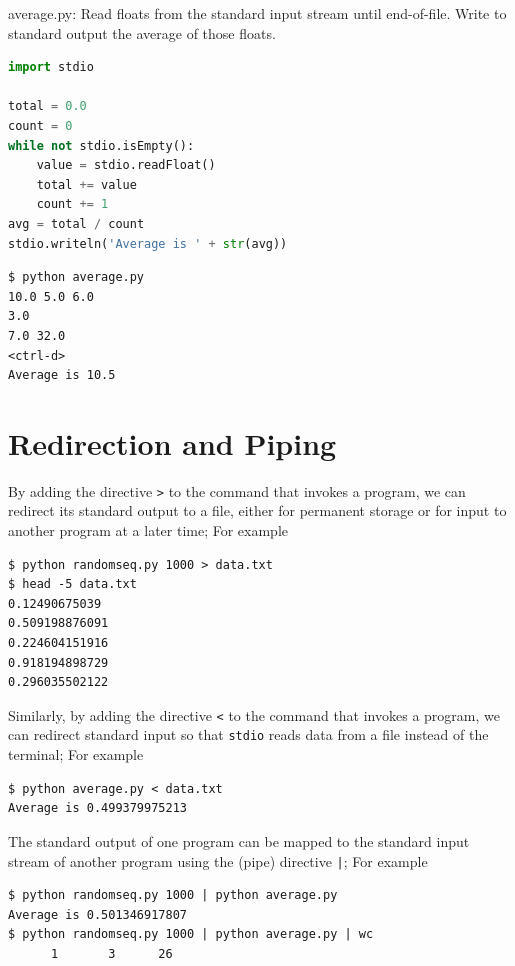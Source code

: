 \documentclass[8pt,a4paper,compress]{beamer}
\begin{document}
\begin{frame}[fragile]
\begin{framed}
\tiny average.py: Read floats from the standard input stream until end-of-file. Write to standard output the average of those floats.
\end{framed}

\begin{lstlisting}[language=Python]
import stdio

total = 0.0
count = 0
while not stdio.isEmpty():
    value = stdio.readFloat()
    total += value
    count += 1
avg = total / count
stdio.writeln('Average is ' + str(avg))
\end{lstlisting}

\begin{lstlisting}[language={}]
$ python average.py
10.0 5.0 6.0
3.0
7.0 32.0
<ctrl-d>
Average is 10.5
\end{lstlisting}
\end{frame}

\section{Redirection and Piping}
\begin{frame}[fragile]
By adding the directive \lstinline{>} to the command that invokes a program, we can redirect its standard output to a file, either for permanent storage or for input to another program at a later time; For example
\begin{lstlisting}[language={}]
$ python randomseq.py 1000 > data.txt
$ head -5 data.txt 
0.12490675039
0.509198876091
0.224604151916
0.918194898729
0.296035502122
\end{lstlisting}

\bigskip

Similarly, by adding the directive \lstinline{<} to the command that invokes a program, we can redirect standard input so that \lstinline{stdio} reads data from a file instead of the terminal; For example
\begin{lstlisting}[language={}]
$ python average.py < data.txt
Average is 0.499379975213
\end{lstlisting}

\bigskip

The standard output of one program can be mapped to the standard input stream of another program using the (pipe) directive \lstinline{|}; For example
\begin{lstlisting}[language={}]
$ python randomseq.py 1000 | python average.py 
Average is 0.501346917807
$ python randomseq.py 1000 | python average.py | wc
      1       3      26
\end{lstlisting}
\end{frame}
\end{document}
